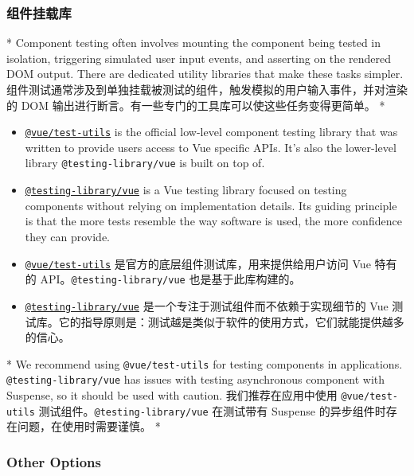 \begin{paracol}{2}
\subsubsection{组件挂载库}
\switchcolumn[0]*%
Component testing often involves mounting the component being tested in
isolation, triggering simulated user input events, and asserting on the
rendered DOM output. There are dedicated utility libraries that make
these tasks simpler.
\switchcolumn
组件测试通常涉及到单独挂载被测试的组件，触发模拟的用户输入事件，并对渲染的
DOM 输出进行断言。有一些专门的工具库可以使这些任务变得更简单。
\switchcolumn[0]*%
\begin{itemize}
\item
  \href{https://github.com/vuejs/test-utils}{\texttt{@vue/test-utils}}
  is the official low-level component testing library that was written
  to provide users access to Vue specific APIs. It's also the
  lower-level library \texttt{@testing-library/vue} is built on top of.
\item
  \href{https://github.com/testing-library/vue-testing-library}{\texttt{@testing-library/vue}}
  is a Vue testing library focused on testing components without relying
  on implementation details. Its guiding principle is that the more
  tests resemble the way software is used, the more confidence they can
  provide.
\end{itemize}
\switchcolumn
\begin{itemize}
\item
  \href{https://github.com/vuejs/test-utils}{\texttt{@vue/test-utils}}
  是官方的底层组件测试库，用来提供给用户访问 Vue 特有的
  API。\texttt{@testing-library/vue} 也是基于此库构建的。
\item
  \href{https://github.com/testing-library/vue-testing-library}{\texttt{@testing-library/vue}}
  是一个专注于测试组件而不依赖于实现细节的 Vue
  测试库。它的指导原则是：测试越是类似于软件的使用方式，它们就能提供越多的信心。
\end{itemize}
\switchcolumn[0]*%
We recommend using \texttt{@vue/test-utils} for testing components in
applications. \texttt{@testing-library/vue} has issues with testing
asynchronous component with Suspense, so it should be used with caution.
\switchcolumn
我们推荐在应用中使用 \texttt{@vue/test-utils}
测试组件。\texttt{@testing-library/vue} 在测试带有 Suspense
的异步组件时存在问题，在使用时需要谨慎。
\switchcolumn[0]*%
\subsubsection{Other Options}
\switchcolumn

\end{paracol}
